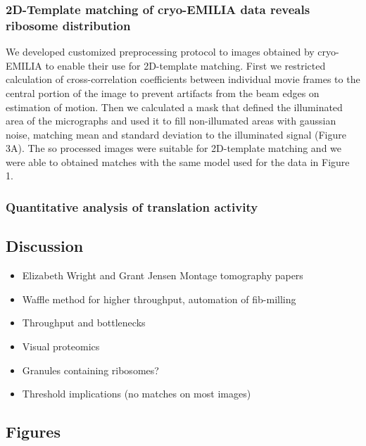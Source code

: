 \documentclass[
]{article}
\begin{document}
\hypertarget{d-template-matching-of-cryo-emilia-data-reveals-ribosome-distribution}{%
\subsubsection{2D-Template matching of cryo-EMILIA data reveals ribosome distribution}\label{d-template-matching-of-cryo-emilia-data-reveals-ribosome-distribution}}

We developed customized preprocessing protocol to images obtained by cryo-EMILIA
to enable their use for 2D-template matching. First we restricted calculation of
cross-correlation coefficients between individual movie frames to the central
portion of the image to prevent artifacts from the beam edges on estimation of
motion. Then we calculated a mask that defined the illuminated area of the
micrographs and used it to fill non-illumated areas with gaussian noise,
matching mean and standard deviation to the illuminated signal (Figure 3A). The
so processed images were suitable for 2D-template matching and we were able to
obtained matches with the same model used for the data in Figure 1.

\hypertarget{quantitative-analysis-of-translation-activity}{%
\subsubsection{Quantitative analysis of translation activity}\label{quantitative-analysis-of-translation-activity}}

\hypertarget{discussion}{%
\subsection{Discussion}\label{discussion}}

\begin{itemize}
\item
  Elizabeth Wright and Grant Jensen Montage tomography papers
\item
  Waffle method for higher throughput, automation of fib-milling
\item
  Throughput and bottlenecks
\item
  Visual proteomics
\item
  Granules containing ribosomes?
\item
  Threshold implications (no matches on most images)
\end{itemize}

\hypertarget{figures}{%
\subsection{Figures}\label{figures}}
\end{document}
